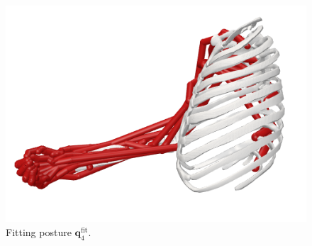\begin{figure}[!htb]
\begin{minipage}{0.3\linewidth}
        \centering
        \includegraphics[trim={0 0 0 0}, clip, width=0.9\linewidth]{img/chapter_4/pose_9_side.png}
    \end{minipage}
    \caption{Fitting posture $\mathbf{q}_4^{\text{fit}}$.}
    \label{fig:pose_4}
\end{figure}

